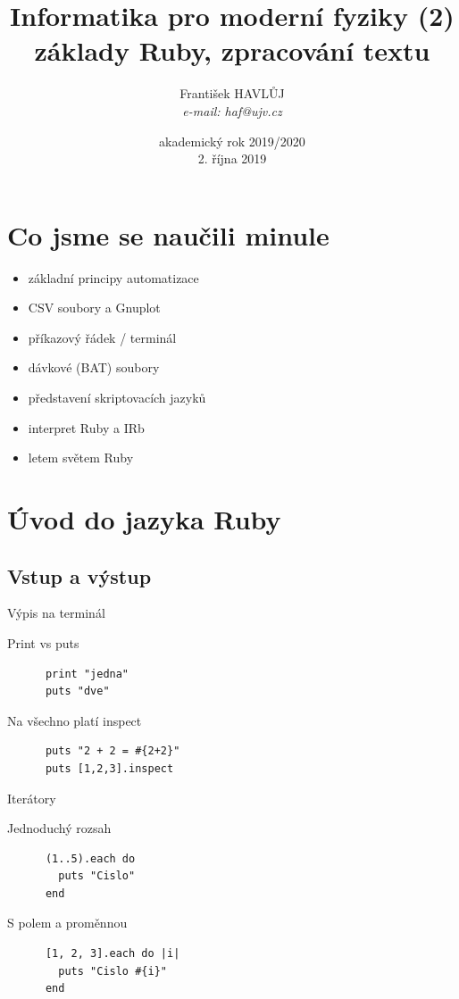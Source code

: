 \documentclass{beamer}
\title[IMF (2)]{Informatika pro moderní fyziky (2)\\základy Ruby, zpracování textu}
\author[Franti\v{s}ek HAVL\r{U}J, ORF ÚJV Řež]{Franti\v{s}ek HAVL\r{U}J\\{\scriptsize \emph{e-mail: haf@ujv.cz}}}
\date{akademický rok 2019/2020\\2. října 2019}
\institute[ORF ÚJV Řež]
{ÚJV Řež\\oddělení Reaktorové fyziky a podpory palivového cyklu}
\begin{document}
\begin{frame}
  \titlepage
\end{frame}

\begin{frame}
  \tableofcontents
\end{frame}

\section{Co jsme se naučili minule}

\begin{frame}{}
  \begin{itemize}
    \item základní principy automatizace
    \item CSV soubory a Gnuplot
    \item příkazový řádek / terminál
    \item dávkové (BAT) soubory
    \item představení skriptovacích jazyků
    \item interpret Ruby a IRb
    \item letem světem Ruby
  \end{itemize}
\end{frame}


\section{Úvod do jazyka Ruby}

\subsection{Vstup a výstup}

\begin{frame}[fragile]{Výpis na terminál}
  \begin{block}{Print vs puts}
    \begin{verbatim}
      print "jedna"
      puts "dve"
    \end{verbatim}
  \end{block}
  \pause
  \begin{block}{Na všechno platí inspect}
    \begin{verbatim}
      puts "2 + 2 = #{2+2}"
      puts [1,2,3].inspect
    \end{verbatim}
  \end{block}
\end{frame}

\begin{frame}[fragile]{Iterátory}
  \begin{block}{Jednoduchý rozsah}
    \begin{verbatim}
      (1..5).each do
        puts "Cislo"
      end
    \end{verbatim}
  \end{block}
  \pause
  \begin{block}{S polem a proměnnou}
    \begin{verbatim}
      [1, 2, 3].each do |i|
        puts "Cislo #{i}"
      end
    \end{verbatim}
  \end{block}
\end{frame}
\end{document}
